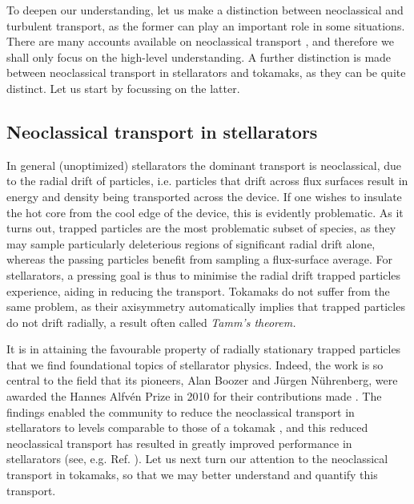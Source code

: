 To deepen our understanding, let us make a distinction between neoclassical and turbulent transport, as the former can play an important role in some situations. There are many accounts available on neoclassical transport \cite{galeev1979reviews,kovrizhnykh1984energy,mynick2006transport,beidler2011benchmarking}, and therefore we shall only focus on the high-level understanding. A further distinction is made between neoclassical transport in stellarators and tokamaks, as they can be quite distinct. Let us start by focussing on the latter.

\subsection*{Neoclassical transport in stellarators}
In general (unoptimized) stellarators the dominant transport is neoclassical, due to the radial drift of particles, i.e. particles that drift across flux surfaces result in energy and density being transported across the device. If one wishes to insulate the hot core from the cool edge of the device, this is evidently problematic. As it turns out, trapped particles are the most problematic subset of species, as they may sample particularly deleterious regions of significant radial drift alone, whereas the passing particles benefit from sampling a flux-surface average. For stellarators, a pressing goal is thus to minimise the radial drift trapped particles experience, aiding in reducing the transport. Tokamaks do not suffer from the same problem, as their axisymmetry automatically implies that trapped particles do not drift radially, a result often called \textit{Tamm's theorem.} \par 
It is in attaining the favourable property of radially stationary trapped particles that we find foundational topics of stellarator physics. Indeed, the work is so central to the field that its pioneers, Alan Boozer and J\"urgen N\"uhrenberg, were awarded the Hannes Alfv\'en Prize in 2010 for their contributions made \cite{mendoncca201037th}. The findings enabled the community to reduce the neoclassical transport in stellarators to levels comparable to those of a tokamak \cite{landreman2022magnetic,paul2022energetic,goodman2022constructing}, and this reduced neoclassical transport has resulted in greatly improved performance in stellarators (see, e.g. Ref. \cite{beidler2021demonstration}). Let us next turn our attention to the neoclassical transport in tokamaks, so that we may better understand and quantify this transport.

